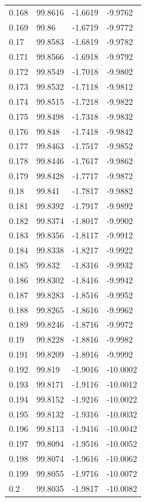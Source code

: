 \begin{tabular}{llll}
0.168 & 99.8616 & -1.6619 & -9.9762 \\
0.169 & 99.86 & -1.6719 & -9.9772 \\
0.17 & 99.8583 & -1.6819 & -9.9782 \\
0.171 & 99.8566 & -1.6918 & -9.9792 \\
0.172 & 99.8549 & -1.7018 & -9.9802 \\
0.173 & 99.8532 & -1.7118 & -9.9812 \\
0.174 & 99.8515 & -1.7218 & -9.9822 \\
0.175 & 99.8498 & -1.7318 & -9.9832 \\
0.176 & 99.848 & -1.7418 & -9.9842 \\
0.177 & 99.8463 & -1.7517 & -9.9852 \\
0.178 & 99.8446 & -1.7617 & -9.9862 \\
0.179 & 99.8428 & -1.7717 & -9.9872 \\
0.18 & 99.841 & -1.7817 & -9.9882 \\
0.181 & 99.8392 & -1.7917 & -9.9892 \\
0.182 & 99.8374 & -1.8017 & -9.9902 \\
0.183 & 99.8356 & -1.8117 & -9.9912 \\
0.184 & 99.8338 & -1.8217 & -9.9922 \\
0.185 & 99.832 & -1.8316 & -9.9932 \\
0.186 & 99.8302 & -1.8416 & -9.9942 \\
0.187 & 99.8283 & -1.8516 & -9.9952 \\
0.188 & 99.8265 & -1.8616 & -9.9962 \\
0.189 & 99.8246 & -1.8716 & -9.9972 \\
0.19 & 99.8228 & -1.8816 & -9.9982 \\
0.191 & 99.8209 & -1.8916 & -9.9992 \\
0.192 & 99.819 & -1.9016 & -10.0002 \\
0.193 & 99.8171 & -1.9116 & -10.0012 \\
0.194 & 99.8152 & -1.9216 & -10.0022 \\
0.195 & 99.8132 & -1.9316 & -10.0032 \\
0.196 & 99.8113 & -1.9416 & -10.0042 \\
0.197 & 99.8094 & -1.9516 & -10.0052 \\
0.198 & 99.8074 & -1.9616 & -10.0062 \\
0.199 & 99.8055 & -1.9716 & -10.0072 \\
0.2 & 99.8035 & -1.9817 & -10.0082 \\

\end{tabular}
